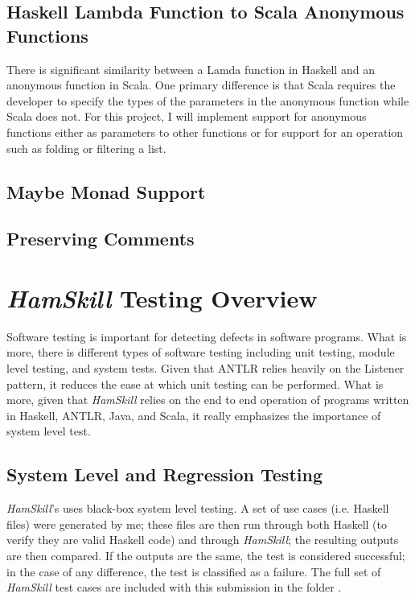 \documentclass{report}
\begin{document}
\subsection{Haskell Lambda Function to Scala Anonymous Functions}\label{sec:lambdaAnonymousFunctions}

There is significant similarity between a Lamda function in Haskell and an anonymous function in Scala.  One primary difference is that Scala requires the developer to specify the types of the parameters in the anonymous function while Scala does not. For this project, I will implement support for anonymous functions either as parameters to other functions or for support for an operation such as folding or filtering a list. 

\subsection{Maybe Monad Support}

\subsection{Preserving Comments}\label{sec:preservingComments}

\section{\textit{HamSkill} Testing Overview}

Software testing is important for detecting defects in software programs.  What is more, there is different types of software testing including unit testing, module level testing, and system tests.  Given that ANTLR relies heavily on the Listener pattern, it reduces the ease at which unit testing can be performed.  What is more, given that \textit{HamSkill} relies on the end to end operation of programs written in Haskell, ANTLR, Java, and Scala, it really emphasizes the importance of system level test.

\subsection{System Level and Regression Testing}

\textit{HamSkill}'s uses black-box system level testing.  A set of use cases (i.e. Haskell files) were generated by me; these files are then run through both Haskell (to verify they are valid Haskell code) and through \textit{HamSkill}; the resulting outputs are then compared.  If the outputs are the same, the test is considered successful; in the case of any difference, the test is classified as a failure.  The full set of \textit{HamSkill} test cases are included with this submission in the folder .
\end{document}
